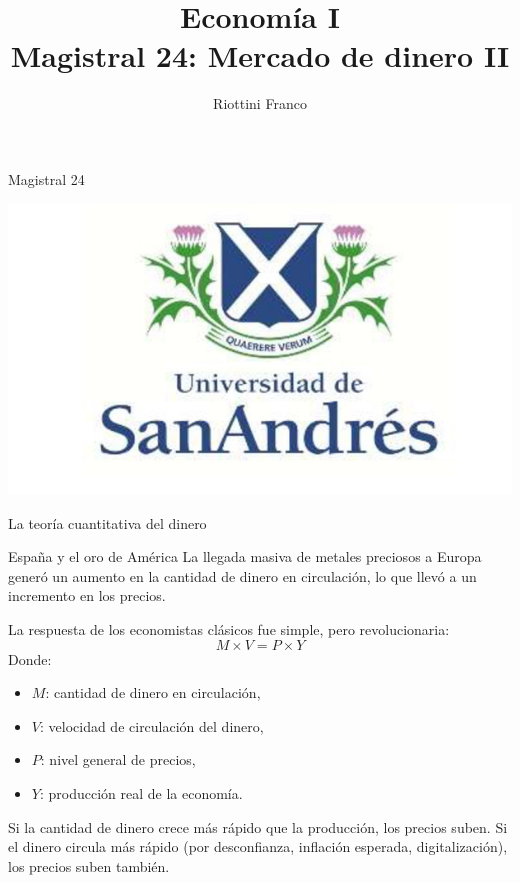 \documentclass{beamer}
\title[Economía I]{Economía I \vspace{4mm}
\\ Magistral 24: Mercado de dinero II}
\date{}
\author[Franco Riottini]{Riottini Franco}
\institute[]{Universidad de San Andrés}
\begin{document}
\begin{frame}
\titlepage
\centering
Magistral 24

\includegraphics[scale=0.2]{../Figures/logoUDESA.jpg} 
\end{frame}

\begin{frame}{La teoría cuantitativa del dinero}

    \begin{block}{España y el oro de América}
        La llegada masiva de metales preciosos a Europa generó un aumento en la cantidad de dinero en circulación, lo que llevó a un incremento en los precios.
    \end{block}

    La respuesta de los economistas clásicos fue simple, pero revolucionaria:
    \[
    M \times V = P \times Y
    \]
    Donde:
    \begin{itemize}
        \item \(M\): cantidad de dinero en circulación,
        \item \(V\): velocidad de circulación del dinero,
        \item \(P\): nivel general de precios,
        \item \(Y\): producción real de la economía.
    \end{itemize}

    Si la cantidad de dinero crece más rápido que la producción, los precios suben. Si el dinero circula más rápido (por desconfianza, inflación esperada, digitalización), los precios suben también.

\end{frame}
\end{document}
